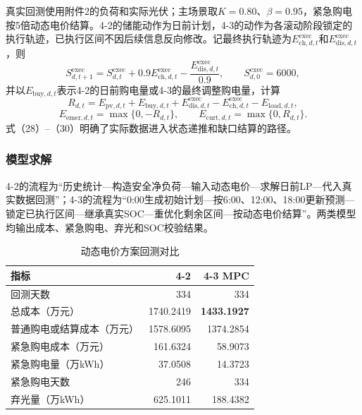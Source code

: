 \documentclass{cumcmthesis}
\begin{document}
真实回测使用附件2的负荷和实际光伏；主场景取$K=0.80$、$\beta=0.95$，紧急购电按5倍动态电价结算。4-2的储能动作为日前计划，4-3的动作为各滚动阶段锁定的执行轨迹，已执行区间不因后续信息反向修改。记最终执行轨迹为$E_{\mathrm{ch},d,t}^{\mathrm{exec}}$和$E_{\mathrm{dis},d,t}^{\mathrm{exec}}$，则
\begin{equation}
S_{d,t+1}^{\mathrm{exec}}=S_{d,t}^{\mathrm{exec}}+0.9E_{\mathrm{ch},d,t}^{\mathrm{exec}}
-\frac{E_{\mathrm{dis},d,t}^{\mathrm{exec}}}{0.9},\qquad S_{d,0}^{\mathrm{exec}}=6000,
\tag{28}
\end{equation}
并以$E_{\mathrm{buy},d,t}$表示4-2的日前购电量或4-3的最终调整购电量，计算
\begin{equation}
R_{d,t}=E_{\mathrm{pv},d,t}+E_{\mathrm{buy},d,t}+E_{\mathrm{dis},d,t}^{\mathrm{exec}}
-E_{\mathrm{ch},d,t}^{\mathrm{exec}}-E_{\mathrm{load},d,t},
\tag{29}
\end{equation}
\begin{equation}
E_{\mathrm{emer},d,t}=\max\{0,-R_{d,t}\},\qquad
E_{\mathrm{curt},d,t}=\max\{0,R_{d,t}\}.
\tag{30}
\end{equation}
式（28）--（30）明确了实际数据进入状态递推和缺口结算的路径。

\subsubsection{模型求解}

4-2的流程为“历史统计—构造安全净负荷—输入动态电价—求解日前LP—代入真实数据回测”；4-3的流程为“0:00生成初始计划—按6:00、12:00、18:00更新预测—锁定已执行区间—继承真实SOC—重优化剩余区间—按动态电价结算”。两类模型均输出成本、紧急购电、弃光和SOC校验结果。

\begin{table}[H]
\centering
\renewcommand\arraystretch{1.2}
\caption{动态电价方案回测对比}
\label{tab:q4main}
\begin{tabular}{lrr}
\toprule
\textbf{指标} & \textbf{4-2} & \textbf{4-3 MPC}\\
\midrule
回测天数 & 334 & 334\\
总成本（万元） & 1740.2419 & \textbf{1433.1927}\\
普通购电或结算成本（万元） & 1578.6095 & 1374.2854\\
紧急购电成本（万元） & 161.6324 & 58.9073\\
紧急购电量（万kWh） & 37.0508 & 14.3723\\
紧急购电天数 & 246 & 334\\
弃光量（万kWh） & 625.1011 & 188.4382\\
\bottomrule
\end{tabular}
\end{table}
\end{document}
